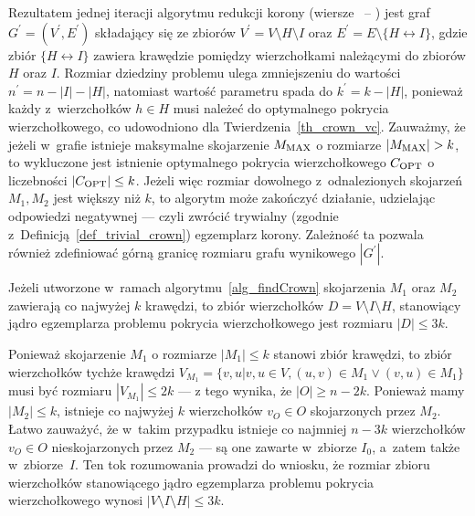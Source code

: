 \par{
  Rezultatem jednej iteracji algorytmu redukcji korony (wiersze~ -- ) jest graf
  $G^\prime=(V^\prime, E^\prime)$ składający się ze zbiorów $V^\prime=V\setminus H \setminus I$ oraz $E^\prime = E \setminus \{H\leftrightarrow I\}$, gdzie zbiór $\{H\leftrightarrow I\}$ zawiera krawędzie pomiędzy wierzchołkami należącymi do zbiorów $H$ oraz $I$.
  Rozmiar dziedziny problemu ulega zmniejszeniu do wartości $n^\prime=n-|I|-|H|$, natomiast wartość parametru spada do $k^\prime=k-|H|$, ponieważ każdy z~wierzchołków $h \in H$ musi należeć do optymalnego pokrycia wierzchołkowego, co udowodniono dla Twierdzenia~\ref{th_crown_vc}.
  Zauważmy, że jeżeli w~grafie istnieje maksymalne skojarzenie $M_{\textnormal{MAX}}$ o rozmiarze $|M_{\textnormal{MAX}}| > k$, to wykluczone jest istnienie optymalnego pokrycia wierzchołkowego $C_{\textnormal{OPT}}$ o liczebności $|C_{\textnormal{OPT}}|\leq k$.
  Jeżeli więc rozmiar dowolnego z~odnalezionych skojarzeń $M_1, M_2$ jest większy niż $k$, to algorytm może zakończyć działanie, udzielając odpowiedzi negatywnej --- czyli zwrócić trywialny (zgodnie z~Definicją~\ref{def_trivial_crown}) egzemplarz korony.
  Zależność ta pozwala również zdefiniować górną granicę rozmiaru grafu wynikowego $|G^\prime|$.
}
\begin{theorem}
  Jeżeli utworzone w~ramach algorytmu~\ref{alg_findCrown} skojarzenia $M_1$ oraz $M_2$ zawierają co najwyżej $k$ krawędzi, to zbiór wierzchołków $D=V \setminus I \setminus H$, stanowiący jądro egzemplarza problemu pokrycia wierzchołkowego jest rozmiaru $|D| \leq 3k$.
\end{theorem}
\begin{bproof}
  Ponieważ skojarzenie $M_1$ o rozmiarze $|M_1| \leq k$ stanowi zbiór krawędzi, to zbiór wierzchołków tychże krawędzi $V_{M_1}=\{v, u|v, u \in V, (u,v)\in M_1 \lor (v,u) \in M_1\}$ musi być rozmiaru $ |V_{M_1}| \leq 2k$ --- z tego wynika, że $|O| \geq n-2k$.
  Ponieważ mamy $|M_2| \leq k$, istnieje co najwyżej $k$ wierzchołków $v_O \in O$ skojarzonych przez $M_2$.
  Łatwo zauważyć, że w~takim przypadku istnieje co najmniej $n-3k$ wierzchołków $v_O \in O$ nieskojarzonych przez $M_2$ --- są one zawarte w~zbiorze $I_0$, a~zatem także w~zbiorze~$I$.
  Ten tok rozumowania prowadzi do wniosku, że rozmiar zbioru wierzchołków stanowiącego jądro egzemplarza problemu pokrycia wierzchołkowego wynosi $|V \setminus I \setminus H| \leq 3k$.
\end{bproof}
